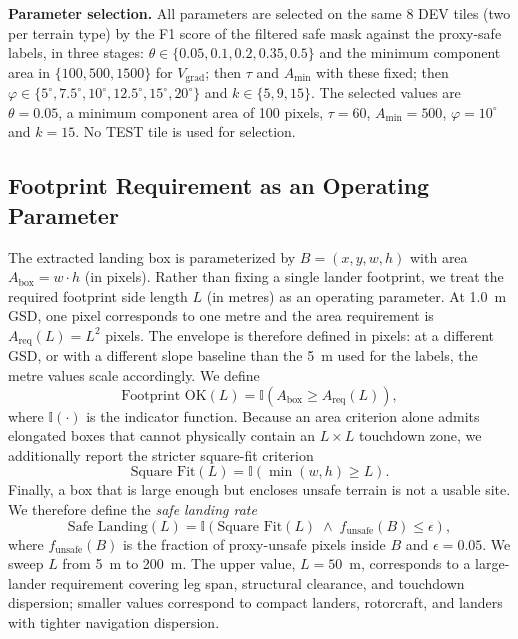 \documentclass{article}
\begin{document}
\textbf{Parameter selection.} All parameters are selected on the same 8 DEV tiles (two per terrain type) by the F1 score of the filtered safe mask against the proxy-safe labels, in three stages: $\theta \in \{0.05, 0.1, 0.2, 0.35, 0.5\}$ and the minimum component area in $\{100, 500, 1500\}$ for $V_{\text{grad}}$; then $\tau$ and $A_{\min}$ with these fixed; then $\varphi \in \{5^\circ, 7.5^\circ, 10^\circ, 12.5^\circ, 15^\circ, 20^\circ\}$ and $k \in \{5, 9, 15\}$. The selected values are $\theta = 0.05$, a minimum component area of 100 pixels, $\tau = 60$, $A_{\min} = 500$, $\varphi = 10^\circ$ and $k = 15$. No TEST tile is used for selection.

\subsection{Footprint Requirement as an Operating Parameter}
\label{sec:footprint}
The extracted landing box is parameterized by $B = (x, y, w, h)$ with area $A_{\text{box}} = w \cdot h$ (in pixels). Rather than fixing a single lander footprint, we treat the required footprint side length $L$ (in metres) as an operating parameter. At 1.0~m GSD, one pixel corresponds to one metre and the area requirement is $A_{\text{req}}(L) = L^2$ pixels. The envelope is therefore defined in pixels: at a different GSD, or with a different slope baseline than the 5~m used for the labels, the metre values scale accordingly. We define
\begin{equation}
    \text{Footprint OK}(L) = \mathbb{I}\!\left(A_{\text{box}} \ge A_{\text{req}}(L)\right),
\end{equation}
where $\mathbb{I}(\cdot)$ is the indicator function. Because an area criterion alone admits elongated boxes that cannot physically contain an $L \times L$ touchdown zone, we additionally report the stricter square-fit criterion
\begin{equation}
    \text{Square Fit}(L) = \mathbb{I}\!\left(\min(w, h) \ge L\right).
\end{equation}
Finally, a box that is large enough but encloses unsafe terrain is not a usable site. We therefore define the \emph{safe landing rate}
\begin{equation}
    \text{Safe Landing}(L) = \mathbb{I}\!\left(\text{Square Fit}(L) \;\wedge\; f_{\text{unsafe}}(B) \le \epsilon\right),
\end{equation}
where $f_{\text{unsafe}}(B)$ is the fraction of proxy-unsafe pixels inside $B$ and $\epsilon = 0.05$. We sweep $L$ from 5~m to 200~m. The upper value, $L = 50$~m, corresponds to a large-lander requirement covering leg span, structural clearance, and touchdown dispersion; smaller values correspond to compact landers, rotorcraft, and landers with tighter navigation dispersion.
\end{document}

